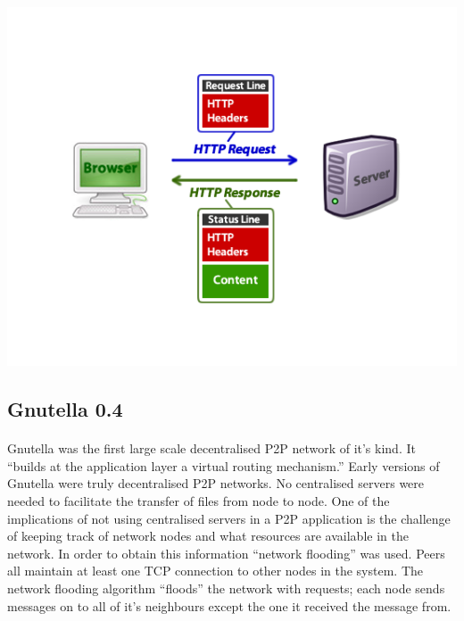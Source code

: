\documentclass[11pt]{amsart}
\begin{document}
\paragraph{}
\includegraphics[scale=.7]{http_diagram}\cite{http_diagram}

\subsection{Gnutella 0.4}\cite{GnutellaCase}
\paragraph{}
Gnutella was the first large scale decentralised P2P network of it's kind. It ``builds at the application layer a virtual routing mechanism.''\cite{GnutellaCase} Early versions of Gnutella were truly decentralised P2P networks. No centralised servers were needed to facilitate the transfer of files from node to node.
One of the implications of not using centralised servers in a P2P application is the challenge of keeping track of network nodes and what resources are available in the network. In order to obtain this information ``network flooding'' was used. Peers all maintain at least one TCP connection to other nodes in the system. The network flooding algorithm ``floods'' the network with requests; each node sends messages on to all of it's neighbours except the one it received the message from. 
\end{document}
